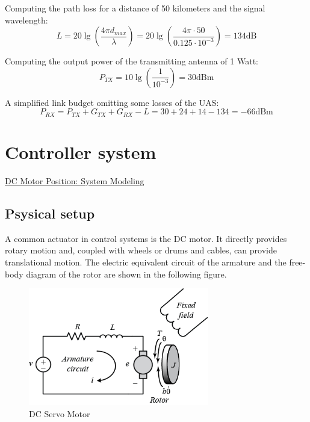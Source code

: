 Computing the path loss for a distance of 50 kilometers and the signal wavelength:
\begin{equation*}\label{eq:tech_parameters3}
	L = 20\lg\left (\frac{4\pi d_{max}}{\lambda} \right)
	  = 20\lg\left (\frac{4\pi \cdot 50}{0.125\cdot 10^{-3}} \right)
	  = 134 \text{dB} 
\end{equation*}

Computing the output power of the transmitting antenna of 1 Watt:
\begin{equation*}\label{eq:tech_parameters4}
	P_{TX} = 10\lg\left (\frac{1}{10^{-3}} \right)  
	       = 30 \text{dBm}
\end{equation*}


A simplified link budget omitting some losses of the UAS:
\begin{equation*}\label{eq:tech_parameters5}
	P_{RX} = P_{TX} + G_{TX} + G_{RX} - L  
	       = 30 + 24 + 14 - 134 = -66 \text{dBm}
\end{equation*}

\section{Controller system}
\href{http://ctms.engin.umich.edu/CTMS/index.php?example=MotorPosition&section=SystemModeling}{DC Motor Position: System Modeling}

\subsection{Psysical setup}
A common actuator in control systems is the DC motor. It directly provides rotary motion and, coupled with wheels or drums and cables, can provide translational motion. The electric equivalent circuit of the armature and the free-body diagram of the rotor are shown in the following figure. 

\begin{figure}[h!]\label{fig:motor_model}
	\centering
	\includegraphics[width=0.7\textwidth]{figures/motor.png}
	\caption{DC Servo Motor}
\end{figure}

